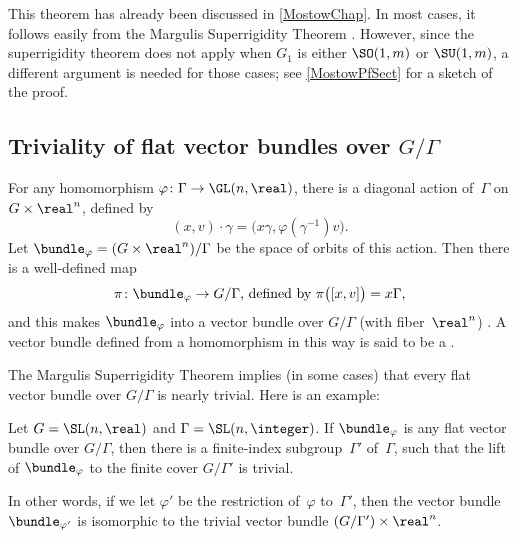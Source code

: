 This theorem has already been discussed in \cref{MostowChap}.
In most cases, it follows easily from the Margulis Superrigidity Theorem . However, since the superrigidity theorem does not apply when $G_1$ is either $\SO(1,m)$ or $\SU(1,m)$, a different argument is needed for those cases; see \cref{MostowPfSect} for a sketch of the proof.


\subsection{Triviality of flat vector bundles over $G/\Gamma$}

\begin{defn} \label{FlatVecBundleDefn}
For any homomorphism $\varphi \colon \Gamma \to \GL(n,\real)$, there is a diagonal action of~$\Gamma$ on $G \times \real^n$, defined by 
	$$ (x,v) \cdot \gamma = \bigl( x \gamma, \varphi(\gamma^{-1}) v \bigr) . $$
Let $\bundle_\varphi = (G \times \real^n) / \Gamma$ 
be the space of orbits of this action. Then there is a well-defined map 
	$$ \text{$\pi \colon \bundle_\varphi \to G/ \Gamma$, defined by $\pi \bigl( [x,v] \bigr) = x \Gamma$,} $$
and this makes $\bundle_\varphi$ into a vector bundle over $G/\Gamma$ (with fiber~$\real^n$) .
A vector bundle defined from a homomorphism in this way is said to be a .
\end{defn}

The Margulis Superrigidity Theorem implies (in some cases) that every flat vector bundle over $G/\Gamma$ is nearly trivial. Here is an example:

\begin{prop} \label{Super->VecBdlTrivial}
Let $G = \SL(n,\real)$ and\/ $\Gamma = \SL(n,\integer)$. If $\bundle_\varphi$ is any flat vector bundle over\/ $G/\Gamma$, then there is a finite-index subgroup\/~$\Gamma'$ of\/~$\Gamma$, such that the lift of $\bundle_\varphi$ to the finite cover\/ $G/\Gamma'$ is trivial.

In other words, if we let $\varphi'$ be the restriction of~$\varphi$ to\/~$\Gamma'$, then the vector bundle $\bundle_{\varphi'}$ is isomorphic to the trivial vector bundle\/ $(G/\Gamma') \times \real^n$.
\end{prop}


